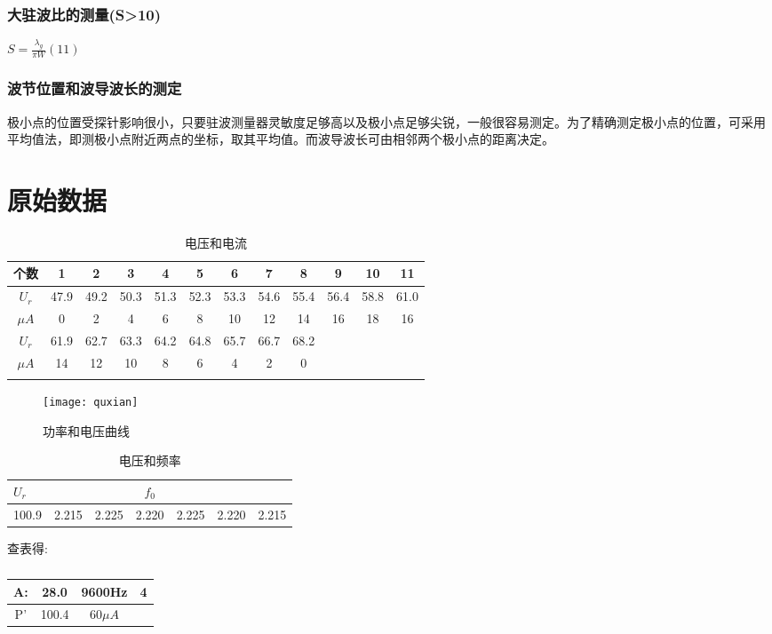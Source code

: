 \documentclass{hfutpaper}
\begin{document}
\subsubsection{大驻波比的测量(S>10)}
\begin{center}
	$S=\frac{\lambda_{g}}{\pi W}(11)$
\end{center}
\subsubsection{波节位置和波导波长的测定}
极小点的位置受探针影响很小，只要驻波测量器灵敏度足够高以及极小点足够尖锐，一般很容易测定。为了精确测定极小点的位置，可采用平均值法，即测极小点附近两点的坐标，取其平均值。而波导波长可由相邻两个极小点的距离决定。\\
\clearpage
\section{原始数据}
\begin{table}[H]
	\caption{电压和电流}
	\centering
	\begin{tabular}{cccccccccccc}
		\toprule[1.5pt]
		个数  & 1&2&3&4&5 & 6 & 7 &8&9&10&11\\
		\midrule
		$U_{r}$&47.9&49.2&50.3&51.3&52.3&53.3&54.6 &55.4&56.4&58.8&61.0\\
		$\mu A$&0&2&4&6&8&10&12 &14&16&18&16\\
		\midrule
		$U_{r}$&61.9&62.7&63.3&64.2&64.8&65.7&66.7&68.2& &\\
		$\mu A$&14&12&10 &8&6&4&2&0& &\\
		\bottomrule[1.5pt]
		\label{tab1}
	\end{tabular}
\end{table}
\begin{figure}[H]%
	\centering  %
	\texttt{[image: quxian]}  %
	\caption{功率和电压曲线}  %
	\label{fig1}
\end{figure}
\begin{table}[H]
	\caption{电压和频率}
	\centering
	\begin{tabular}{|l|cccccc}
		\toprule[1.5pt]
		$U_{r}$&&&$f_{0}$&&\\
		\midrule
		100.9&2.215&2.225&2.220&2.225&2.220&2.215\\
		\bottomrule[1.5pt]
	\end{tabular}
\end{table}
查表得:\\
\begin{table}[H]
	\caption{}
	\centering
	\begin{tabular}{cccc}
		\toprule[1.5pt]
		A:&28.0&9600Hz&4\\
		\midrule
		P'&100.4&60$\mu A$&\\
		\bottomrule[1.5pt]
	\end{tabular}
\end{table}
\clearpage
\end{document}
